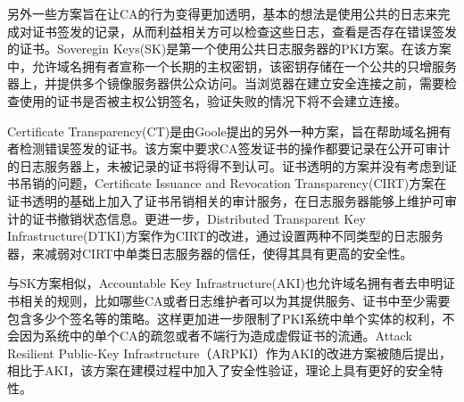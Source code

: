 另外一些方案旨在让CA的行为变得更加透明，基本的想法是使用公共的日志来完成对证书签发的记录，从而利益相关方可以检查这些日志，查看是否存在错误签发的证书。Soveregin Keys(SK)\cite{eckersley2012internet}是第一个使用公共日志服务器的PKI方案。在该方案中，允许域名拥有者宣称一个长期的主权密钥，该密钥存储在一个公共的只增服务器上，并提供多个镜像服务器供公众访问。当浏览器在建立安全连接之前，需要检查使用的证书是否被主权公钥签名，验证失败的情况下将不会建立连接。

Certificate Transparency(CT)\cite{laurie2013certificate}是由Goole提出的另外一种方案，旨在帮助域名拥有者检测错误签发的证书。该方案中要求CA签发证书的操作都要记录在公开可审计的日志服务器上，未被记录的证书将得不到认可。证书透明的方案并没有考虑到证书吊销的问题，Certificate Issuance and Revocation Transparency(CIRT)\cite{ryan2014enhanced}方案在证书透明的基础上加入了证书吊销相关的审计服务，在日志服务器能够上维护可审计的证书撤销状态信息。更进一步，Distributed Transparent Key Infrastructure(DTKI)\cite{cheval2014dtki}方案作为CIRT的改进，通过设置两种不同类型的日志服务器，来减弱对CIRT中单类日志服务器的信任，使得其具有更高的安全性。


与SK方案相似，Accountable Key Infrastructure(AKI)\cite{kim2013accountable}也允许域名拥有者去申明证书相关的规则，比如哪些CA或者日志维护者可以为其提供服务、证书中至少需要包含多少个签名等的策略。这样更加进一步限制了PKI系统中单个实体的权利，不会因为系统中的单个CA的疏忽或者不端行为造成虚假证书的流通。Attack Resilient Public-Key Infrastructure（ARPKI）\cite{basin2014arpki}作为AKI的改进方案被随后提出，相比于AKI，该方案在建模过程中加入了安全性验证，理论上具有更好的安全特性。





%

